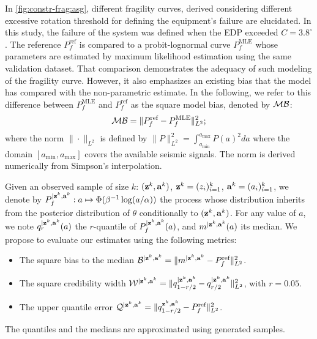 In \cref{fig:constr-frag:asg},
different fragility curves, derived considering different excessive rotation threshold for defining the equipment's failure are elucidated. 
In this study, the failure of the system was defined when the EDP exceeded $C=3.8^\circ$.
The reference $P^{\text{ref}}_f$ is compared to a probit-lognormal curve $P^{\text{MLE}}_f$ whose parameters are estimated by maximum likelihood estimation using the same validation dataset.
That comparison demonstrates the adequacy of such modeling of the fragility curve. However, it also emphasizes an existing bias that the model has compared with the non-parametric estimate. In the following, we refer to this difference between $P_f^{\text{MLE}}$ and $P_f^{\text{ref}}$ as the square model bias, denoted by $\mathcal{M}\mathcal{B}$:
\begin{equation}
    \mathcal{M}\mathcal{B} = \|P^{\text{ref}}_f - P^{\text{MLE}}_f  \|_{L^2}^2;
\end{equation}
where the norm $\|\cdot \|_{L^2}$ is defined by $\|P\|_{L^2}^2=\int_{a_{\min}}^{a_{\max}} P(a)^2da$ where the domain $[a_{\min},a_{\max}]
$ covers the available seismic signals. The norm is derived numerically from Simpson's interpolation. %




Given an observed sample of size $k$: $(\mathbf{z}^k,\mathbf{a}^k)$, $\mathbf{z}^k=(z_i)_{i=1}^k$, $\mathbf{a}^k=(a_i)_{i=1}^k$, we denote by $P_f^{|\mathbf{z}^k,\mathbf{a}^k}:a\mapsto \Phi(\beta^{-1}\log (a/\alpha))$ the process whose distribution inherits from the posterior distribution  of $\theta$ conditionally to $(\mathbf{z}^k,\mathbf{a}^k)$. For any value of $a$, we note $q_{r}^{|\mathbf{z}^k,\mathbf{a}^k}(a)$ the $r$-quantile of $P^{|\mathbf{z}^k,\mathbf{a}^k}_f(a)$, and $m^{|\mathbf{z}^k,\mathbf{a}^k}(a)$ its median.
We propose to evaluate our estimates using the following metrics:
\begin{itemize}
    \item The square bias to the median $\mathcal{B}^{|\mathbf{z}^k,\mathbf{a}^k}=\|m^{|\mathbf{z}^k,\mathbf{a}^k}-P^{\text{ref}}_f\|^2_{L^2}$.
    \item The square credibility width $\mathcal{W}^{|\mathbf{z}^k,\mathbf{a}^k}=\|q_{1-r/2}^{|\mathbf{z}^k,\mathbf{a}^k} - q_{r/2}^{|\mathbf{z}^k,\mathbf{a}^k}\|^2_{L^2}$, with $r=0.05$.
    \item The upper quantile error $\mathcal{Q}^{|\mathbf{z}^k,\mathbf{a}^k}=\|q_{1-r/2}^{\mathbf{z}^k,\mathbf{a}^k}-P_f^{\text{ref}} \|^2_{L^2}$.
\end{itemize}
%
The quantiles and the medians are approximated using generated samples.









